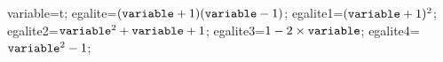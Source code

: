 \documentclass[exercice]{thedocument}%
\begin{document}
%
    \>variable=t;%
    \>egalite={$(\<variable;+1)(\<variable;-1)$};%
    \>egalite1=$({\<variable;}+1)^2$;%
    \>egalite2=${\<variable;}^2+{\<variable;}+1$;%
    \>egalite3=$1-2\times{\<variable;}$;%
    \>egalite4=${\<variable;^2}-1$;%
\end{document}
